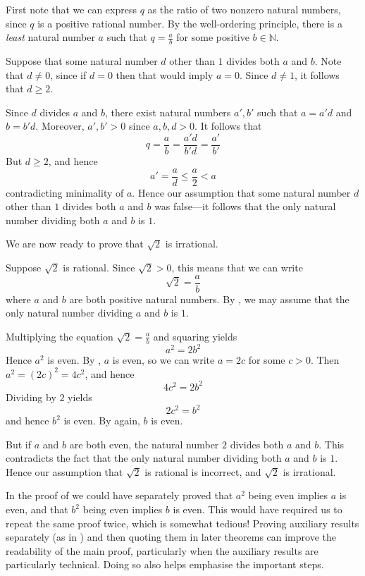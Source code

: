 \begin{cproof}
First note that we can express $q$ as the ratio of two nonzero natural numbers, since $q$ is a positive rational number. By the well-ordering principle, there is a \textit{least} natural number $a$ such that $q=\frac{a}{b}$ for some positive $b \in \mathbb{N}$.

Suppose that some natural number $d$ other than $1$ divides both $a$ and $b$. Note that $d \ne 0$, since if $d=0$ then that would imply $a=0$. Since $d \ne 1$, it follows that $d \ge 2$.

Since $d$ divides $a$ and $b$, there exist natural numbers $a',b'$ such that $a=a'd$ and $b=b'd$. Moreover, $a',b'>0$ since $a,b,d > 0$. It follows that
\[ q = \frac{a}{b} = \frac{a'd}{b'd} = \frac{a'}{b'} \]
But $d \ge 2$, and hence
\[ a' = \frac{a}{d} \le \frac{a}{2} < a \]
contradicting minimality of $a$. Hence our assumption that some natural number $d$ other than $1$ divides both $a$ and $b$ was false---it follows that the only natural number dividing both $a$ and $b$ is $1$.
\end{cproof}

We are now ready to prove that $\sqrt{2}$ is irrational.

\begin{cproof}
Suppose $\sqrt{2}$ is rational. Since $\sqrt{2}>0$, this means that we can write
\[ \sqrt{2} = \frac{a}{b} \]
where $a$ and $b$ are both positive natural numbers. By , we may assume that the only natural number dividing $a$ and $b$ is $1$.

Multiplying the equation $\sqrt{2} = \frac{a}{b}$ and squaring yields
\[ a^2=2b^2 \]
Hence $a^2$ is even. By , $a$ is even, so we can write $a=2c$ for some $c > 0$. Then $a^2=(2c)^2=4c^2$, and hence
\[ 4c^2=2b^2 \]
Dividing by $2$ yields
\[ 2c^2 = b^2 \]
and hence $b^2$ is even. By  again, $b$ is even.

But if $a$ and $b$ are both even, the natural number $2$ divides both $a$ and $b$. This contradicts the fact that the only natural number dividing both $a$ and $b$ is $1$. Hence our assumption that $\sqrt{2}$ is rational is incorrect, and $\sqrt{2}$ is irrational.
\end{cproof}

\begin{writingtip}
In the proof of  we could have separately proved that $a^2$ being even implies $a$ is even, and that $b^2$ being even implies $b$ is even. This would have required us to repeat the same proof twice, which is somewhat tedious! Proving auxiliary results separately (as in ) and then quoting them in later theorems can improve the readability of the main proof, particularly when the auxiliary results are particularly technical. Doing so also helps emphasise the important steps.
\end{writingtip}

